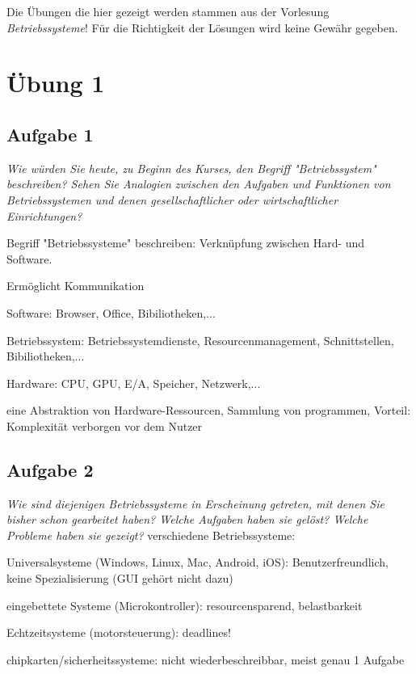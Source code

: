 \documentclass[a4paper]{article}
\begin{document}
\begin{myboxii}[Disclaimer]
    Die Übungen die hier gezeigt werden stammen aus der Vorlesung \textit{Betriebssysteme}! Für die Richtigkeit der Lösungen wird keine Gewähr gegeben.
\end{myboxii}


\section{Übung 1}
\subsection{Aufgabe 1}
\textit{Wie würden Sie heute, zu Beginn des Kurses, den Begriff "Betriebssystem" beschreiben? Sehen Sie Analogien zwischen den Aufgaben und Funktionen von Betriebssystemen und denen gesellschaftlicher oder wirtschaftlicher Einrichtungen?}
\vspace{10mm}

Begriff "Betriebssysteme" beschreiben: Verknüpfung zwischen Hard- und Software.
\begin{itemize*}
    \item Ermöglicht Kommunikation
    \item Software: Browser, Office, Bibiliotheken,...
    \item Betriebssystem: Betriebssystemdienste, Resourcenmanagement, Schnittstellen, Bibiliotheken,...
    \item Hardware: CPU, GPU, E/A, Speicher, Netzwerk,...
\end{itemize*}
eine Abstraktion von Hardware-Ressourcen, Sammlung von programmen,
Vorteil: Komplexität verborgen vor dem Nutzer

\subsection{Aufgabe 2}
\textit{Wie sind diejenigen Betriebssysteme in Erscheinung getreten, mit denen Sie bisher schon gearbeitet haben? Welche Aufgaben haben sie gelöst? Welche Probleme haben sie gezeigt?}
\vspace{10mm}
verschiedene Betriebssysteme:
\begin{itemize*}
    \item Universalsysteme (Windows, Linux, Mac, Android, iOS): Benutzerfreundlich, keine Spezialisierung (GUI gehört nicht dazu)
    \item eingebettete Systeme (Microkontroller): resourcensparend, belastbarkeit
    \item Echtzeitsysteme (motorsteuerung): deadlines!
    \item chipkarten/sicherheitssysteme: nicht wiederbeschreibbar, meist genau 1 Aufgabe
\end{itemize*}
\end{document}
